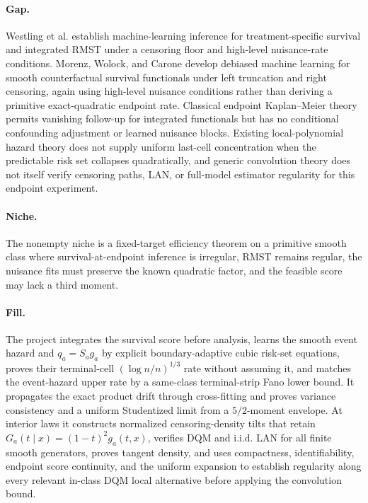 \documentclass{article}
\begin{document}
\paragraph{Gap.} Westling et al. establish machine-learning inference for treatment-specific survival and integrated RMST under a censoring floor and high-level nuisance-rate conditions. Morenz, Wolock, and Carone develop debiased machine learning for smooth counterfactual survival functionals under left truncation and right censoring, again using high-level nuisance conditions rather than deriving a primitive exact-quadratic endpoint rate. Classical endpoint Kaplan--Meier theory permits vanishing follow-up for integrated functionals but has no conditional confounding adjustment or learned nuisance blocks. Existing local-polynomial hazard theory does not supply uniform last-cell concentration when the predictable risk set collapses quadratically, and generic convolution theory does not itself verify censoring paths, LAN, or full-model estimator regularity for this endpoint experiment.

\paragraph{Niche.} The nonempty niche is a fixed-target efficiency theorem on a primitive smooth class where survival-at-endpoint inference is irregular, RMST remains regular, the nuisance fits must preserve the known quadratic factor, and the feasible score may lack a third moment.

\paragraph{Fill.} The project integrates the survival score before analysis, learns the smooth event hazard and \(q_a=S_ag_a\) by explicit boundary-adaptive cubic risk-set equations, proves their terminal-cell \((\log n/n)^{1/3}\) rate without assuming it, and matches the event-hazard upper rate by a same-class terminal-strip Fano lower bound. It propagates the exact product drift through cross-fitting and proves variance consistency and a uniform Studentized limit from a \(5/2\)-moment envelope. At interior laws it constructs normalized censoring-density tilts that retain \(G_a(t\mid x)=(1-t)^2g_a(t,x)\), verifies DQM and i.i.d. LAN for all finite smooth generators, proves tangent density, and uses compactness, identifiability, endpoint score continuity, and the uniform expansion to establish regularity along every relevant in-class DQM local alternative before applying the convolution bound.
\end{document}

